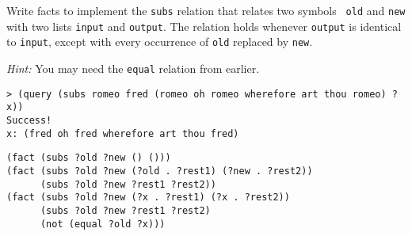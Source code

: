 \question
Write facts to implement the {\tt subs} relation that relates two symbols {\tt
old} and {\tt new} with two lists {\tt input} and {\tt output}. The relation
holds whenever {\tt output} is identical to {\tt input}, except with every
occurrence of {\tt old} replaced by {\tt new}.

{\it Hint:} You may need the {\tt equal} relation from earlier.

\begin{lstlisting}
> (query (subs romeo fred (romeo oh romeo wherefore art thou romeo) ?x))
Success!
x: (fred oh fred wherefore art thou fred)
\end{lstlisting}

\begin{solution}[1.7in]
\begin{lstlisting}
(fact (subs ?old ?new () ()))
(fact (subs ?old ?new (?old . ?rest1) (?new . ?rest2))
      (subs ?old ?new ?rest1 ?rest2))
(fact (subs ?old ?new (?x . ?rest1) (?x . ?rest2))
      (subs ?old ?new ?rest1 ?rest2)
      (not (equal ?old ?x)))
\end{lstlisting}
\end{solution}
